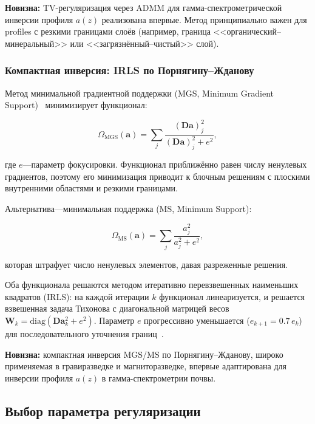 \documentclass[12pt,a4paper]{article}
\newcommand{\va}{\mathbf{a}}
\newcommand{\mD}{\mathbf{D}}
\newcommand{\mW}{\mathbf{W}}
\begin{document}
\textbf{Новизна:} TV-регуляризация через ADMM для гамма-спектрометрической
инверсии профиля $a(z)$ реализована впервые.
Метод принципиально важен для profiles с резкими
границами слоёв (например, граница <<органический--минеральный>>
или <<загрязнённый--чистый>> слой).

\subsubsection{Компактная инверсия: IRLS по Порнягину--Жданову}
\label{sub:focusing}

Метод минимальной градиентной поддержки (MGS, Minimum Gradient
Support)~\citep{Portniaguine1999, Zhdanov2002} минимизирует функционал:

\begin{equation}
  \Omega_{\mathrm{MGS}}(\va) = \sum_j \frac{(\mD\va)_j^2}{(\mD\va)_j^2 + e^2},
  \label{eq:mgs}
\end{equation}

где $e$---параметр фокусировки.
Функционал приближённо равен числу ненулевых градиентов,
поэтому его минимизация приводит к блочным решениям с плоскими
внутренними областями и резкими границами.

Альтернатива---минимальная поддержка (MS, Minimum Support):

\begin{equation}
  \Omega_{\mathrm{MS}}(\va) = \sum_j \frac{a_j^2}{a_j^2 + e^2},
  \label{eq:ms}
\end{equation}

которая штрафует число ненулевых элементов, давая разреженные решения.

Оба функционала решаются методом итеративно перевзвешенных
наименьших квадратов (IRLS): на каждой итерации $k$
функционал линеаризуется, и решается взвешенная задача Тихонова
с диагональной матрицей весов $\mW_k = \mathrm{diag}(\mD\va_k^2 + e^2)$.
Параметр $e$ прогрессивно уменьшается ($e_{k+1} = 0.7\,e_k$)
для последовательного уточнения границ~\citep{Zhdanov2002}.

\textbf{Новизна:} компактная инверсия MGS/MS по Порнягину--Жданову,
широко применяемая в гравиразведке и магниторазведке,
впервые адаптирована для инверсии профиля $a(z)$
в гамма-спектрометрии почвы.

\subsection{Выбор параметра регуляризации}
\label{sub:criteria}
\end{document}
